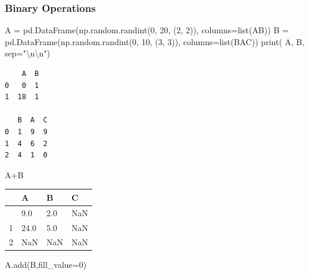 \documentclass[
  a4paper,
  DIV=11,
  numbers=noendperiod]{scrreprt}
\newenvironment{Shaded}{\begin{snugshade}}{\end{snugshade}}
\newcommand{\BuiltInTok}[1]{\textcolor[rgb]{0.00,0.23,0.31}{#1}}
\newcommand{\CharTok}[1]{\textcolor[rgb]{0.13,0.47,0.30}{#1}}
\newcommand{\DecValTok}[1]{\textcolor[rgb]{0.68,0.00,0.00}{#1}}
\newcommand{\NormalTok}[1]{\textcolor[rgb]{0.00,0.23,0.31}{#1}}
\newcommand{\OperatorTok}[1]{\textcolor[rgb]{0.37,0.37,0.37}{#1}}
\newcommand{\StringTok}[1]{\textcolor[rgb]{0.13,0.47,0.30}{#1}}
\begin{document}
\subsubsection{Binary Operations}\label{binary-operations}

\begin{Shaded}
\begin{Highlighting}[]
\NormalTok{A }\OperatorTok{=}\NormalTok{ pd.DataFrame(np.random.randint(}\DecValTok{0}\NormalTok{, }\DecValTok{20}\NormalTok{, (}\DecValTok{2}\NormalTok{, }\DecValTok{2}\NormalTok{)), columns}\OperatorTok{=}\BuiltInTok{list}\NormalTok{(}\StringTok{\textquotesingle{}AB\textquotesingle{}}\NormalTok{))}
\NormalTok{B }\OperatorTok{=}\NormalTok{ pd.DataFrame(np.random.randint(}\DecValTok{0}\NormalTok{, }\DecValTok{10}\NormalTok{, (}\DecValTok{3}\NormalTok{, }\DecValTok{3}\NormalTok{)), columns}\OperatorTok{=}\BuiltInTok{list}\NormalTok{(}\StringTok{\textquotesingle{}BAC\textquotesingle{}}\NormalTok{))}
\BuiltInTok{print}\NormalTok{( A, B, sep}\OperatorTok{=}\StringTok{"}\CharTok{\textbackslash{}n\textbackslash{}n}\StringTok{"}\NormalTok{)}
\end{Highlighting}
\end{Shaded}

\begin{verbatim}
    A  B
0   0  1
1  18  1

   B  A  C
0  1  9  9
1  4  6  2
2  4  1  0
\end{verbatim}

\begin{Shaded}
\begin{Highlighting}[]
\NormalTok{A}\OperatorTok{+}\NormalTok{B}
\end{Highlighting}
\end{Shaded}

\begin{longtable}[]{@{}llll@{}}
\toprule\noalign{}
& A & B & C \\
\midrule\noalign{}
\endhead
\bottomrule\noalign{}
\endlastfoot
0 & 9.0 & 2.0 & NaN \\
1 & 24.0 & 5.0 & NaN \\
2 & NaN & NaN & NaN \\
\end{longtable}

\begin{Shaded}
\begin{Highlighting}[]
\NormalTok{A.add(B,fill\_value}\OperatorTok{=}\DecValTok{0}\NormalTok{)}
\end{Highlighting}
\end{Shaded}
\end{document}
